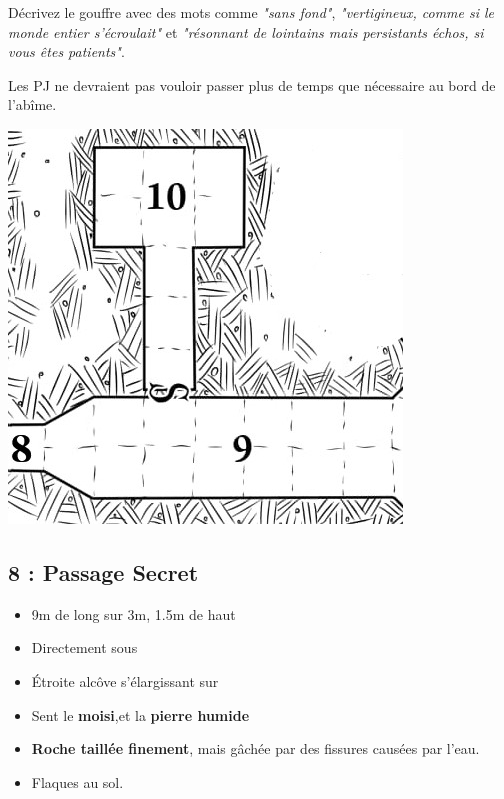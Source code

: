 Décrivez le gouffre avec des mots comme \emph{"sans fond"}, \emph{"vertigineux, comme si le monde entier s'écroulait"} et \emph{"résonnant de lointains mais persistants échos, si vous êtes patients"}.

Les PJ ne devraient pas vouloir passer plus de temps que nécessaire au bord de l'abîme.


\ifmulticolEnd
\begin{center}
  \includegraphics[width=0.6\linewidth]{pics/map_8-10.jpg}
\end{center}
\ifmulticolStart

\subsection{8 : Passage Secret}\label{n2:s8}
\begin{itemize}
  \item 9m de long sur 3m, 1.5m de haut
  \item Directement sous \textbf{}
  \item \'Etroite alcôve s'élargissant sur \textbf{}
  \item Sent le \textbf{moisi},et la \textbf{pierre humide}
  \item \textbf{Roche taillée finement}, mais gâchée par des fissures causées par l'eau.
  \item Flaques au sol.
\end{itemize}

